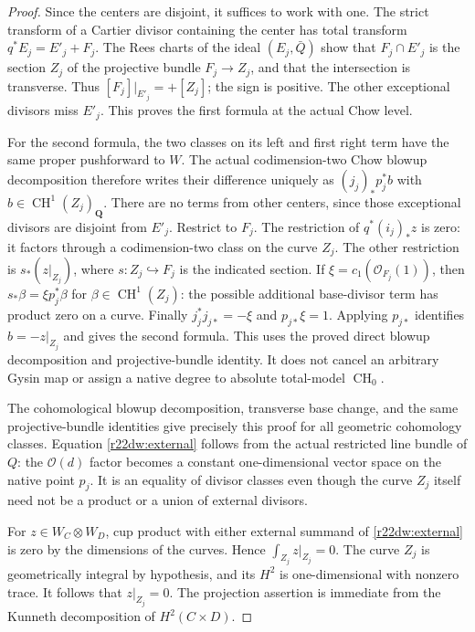 \begin{proof}
Since the centers are disjoint, it suffices to work with one.  The
strict transform of a Cartier divisor containing the center has
total transform $q^*E_j=E'_j+F_j$.  The Rees charts of the ideal
$(E_j,\bar Q)$ show that $F_j\cap E'_j$ is the section $Z_j$ of
the projective bundle $F_j\to Z_j$, and that the intersection is
transverse.  Thus $[F_j]|_{E'_j}=+[Z_j]$; the sign is positive.
The other exceptional divisors miss $E'_j$.  This proves the first
formula at the actual Chow level.

For the second formula, the two classes on its left and first
right term have the same proper pushforward to $W$.  The actual
codimension-two Chow blowup decomposition therefore writes their
difference uniquely as $(j_j)_*p_j^*b$ with
$b\in\operatorname{CH}^1(Z_j)_{\mathbf Q}$.  There are no terms
from other centers, since those exceptional divisors are disjoint
from $E'_j$.  Restrict to $F_j$.  The restriction of
$q^*(i_j)_*z$ is zero: it factors through a codimension-two class
on the curve $Z_j$.  The other restriction is
$s_*(z|_{Z_j})$, where $s:Z_j\hookrightarrow F_j$ is the indicated
section.  If $\xi=c_1(\mathcal O_{F_j}(1))$, then
$s_*\beta=\xi p_j^*\beta$ for $\beta\in\operatorname{CH}^1(Z_j)$:
the possible additional base-divisor term has product zero on a
curve.  Finally $j_j^*j_{j*}=-\xi$ and $p_{j*}\xi=1$.
Applying $p_{j*}$ identifies $b=-z|_{Z_j}$ and gives the second
formula.  This uses the proved direct blowup decomposition and
projective-bundle identity.  It does not cancel an arbitrary
Gysin map or assign a native degree to absolute total-model
$\operatorname{CH}_0$.

The cohomological blowup decomposition, transverse base change,
and the same projective-bundle identities give precisely this
proof for all geometric cohomology classes.  Equation
\eqref{r22dw:external} follows from the actual restricted line
bundle of $Q$: the $\mathcal O(d)$ factor becomes a constant
one-dimensional vector space on the native point $p_j$.
It is an equality of divisor classes even though the curve $Z_j$
itself need not be a product or a union of external divisors.

For $z\in W_C\otimes W_D$, cup product with either external
summand of \eqref{r22dw:external} is zero by the dimensions of the
curves.  Hence $\int_{Z_j}z|_{Z_j}=0$.  The curve $Z_j$ is
geometrically integral by hypothesis, and its $H^2$ is
one-dimensional with nonzero trace.  It follows that $z|_{Z_j}=0$.
The projection assertion is immediate from the Kunneth
decomposition of $H^2(C\times D)$.
\end{proof}

